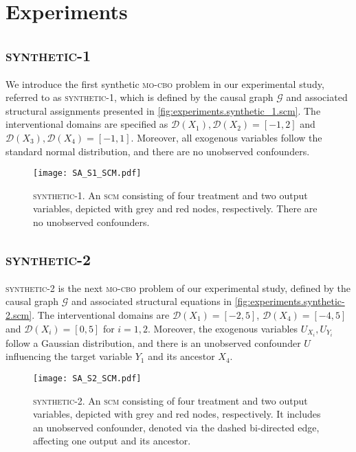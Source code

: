 \section{Experiments}\label{appendix:experiments}

\subsection{\textsc{synthetic-1}}\label{subsec:experiments.synthetic-1}
We introduce the first synthetic \textsc{mo-cbo} problem in our experimental study, referred to as \textsc{synthetic-1}, which is defined by the causal graph $\mathcal{G}$ and associated structural assignments presented in \autoref{fig:experiments.synthetic_1.scm}. The interventional domains are specified as $\mathcal{D}(X_1),\mathcal{D}(X_2) = [-1,2]$ and $\mathcal{D}(X_3),\mathcal{D}(X_4) = [-1,1]$. Moreover, all exogenous variables follow the standard normal distribution, and there are no unobserved confounders. 

\begin{figure}[t]
    \centering
    \vspace{-1.5cm}
    \texttt{[image: SA\_S1\_SCM.pdf]}
    \vspace{-0.7cm}
    \caption{\textsc{synthetic-1}. An \textsc{scm} consisting of four treatment and two output variables, depicted with grey and red nodes, respectively. There are no unobserved confounders.}
    \label{fig:experiments.synthetic_1.scm}
\end{figure}

\subsection{\textsc{synthetic}-2}\label{subsec:experiments.synthetic-2}
\textsc{synthetic-2} is the next \textsc{mo-cbo} problem of our experimental study, defined by the causal graph $\mathcal{G}$ and associated structural equations in \autoref{fig:experiments.synthetic-2.scm}. The interventional domains are $\mathcal{D}(X_1) = [-2,5]$, $\mathcal{D}(X_4) = [-4,5]$ and $\mathcal{D}(X_i) = [0,5]$ for $i=1,2$. Moreover, the exogenous variables $U_{X_i}, U_{Y_i}$ follow a Gaussian distribution, and there is an unobserved confounder $U$ influencing the target variable $Y_1$ and its ancestor $X_4$.

\begin{figure}[h]
    \centering
    \vspace{-1cm}
    \texttt{[image: SA\_S2\_SCM.pdf]}
    \vspace{-2.5cm}
    \caption{\textsc{synthetic-2}. An \textsc{scm} consisting of four treatment and two output variables, depicted with grey and red nodes, respectively. It includes an unobserved confounder, denoted via the dashed bi-directed edge, affecting one output and its ancestor.}
    \label{fig:experiments.synthetic-2.scm}
\end{figure}


